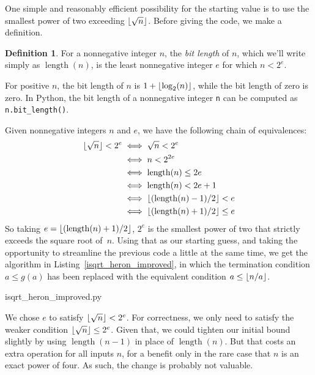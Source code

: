 \documentclass[a4paper]{article}
\DeclarePairedDelimiter\floor{\lfloor}{\rfloor}
\DeclareMathOperator{\length}{length}
\theoremstyle{plain}
\theoremstyle{definition}
\newtheorem{definition}[theorem]{Definition}
\begin{document}
One simple and reasonably efficient possibility for the starting value is to
use the smallest power of two exceeding $\floor{\sqrt n}$. Before giving the
code, we make a definition.

\begin{definition}
  For a nonnegative integer $n$, the \emph{bit length} of $n$, which we'll
  write simply as $\length(n)$, is the least nonnegative integer $e$ for which
  $n < 2^e$.
\end{definition}

For positive $n$, the bit length of $n$ is $1 + \floor{\log_2(n)}$, while the
bit length of zero is zero. In Python, the bit length of a nonnegative integer
\lstinline$n$ can be computed as \lstinline$n.bit_length()$.

Given nonnegative integers $n$ and $e$, we have the following chain
of equivalences:
\begin{align*}
  \floor{\sqrt n} < 2^e
    &\iff \sqrt n < 2^e \\
    &\iff n < 2^{2e} \\
    &\iff \length(n) \le 2e \\
    &\iff \length(n) < 2e + 1 \\
    &\iff \floor{(\length(n) - 1) / 2} < e \\
    &\iff \floor{(\length(n) + 1) / 2} \le e
\end{align*}
So taking $e = \floor{(\length(n) + 1) / 2}$, $2^e$ is the smallest power of
two that strictly exceeds the square root of~$n$. Using that as our starting
guess, and taking the opportunity to streamline the previous code a little at
the same time, we get the algorithm in Listing~\ref{isqrt_heron_improved}, in
which the termination condition $a \le g(a)$ has been replaced with the
equivalent condition $a \le \floor{n/a}$.


  {isqrt_heron_improved.py}

We chose $e$ to satisfy $\floor{\sqrt n} < 2^e$. For correctness, we only need
to satisfy the weaker condition $\floor{\sqrt n} \le 2^e$. Given that, we could
tighten our initial bound slightly by using $\length(n-1)$ in place of
$\length(n)$. But that costs an extra operation for all inputs $n$, for a
benefit only in the rare case that $n$ is an exact power of four. As such, the
change is probably not valuable.
\end{document}
